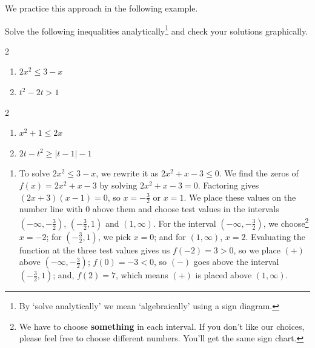 \documentclass{ximera}
\begin{document}

\medskip

We practice this approach in the following example.

\begin{example}  Solve the following inequalities analytically\footnote{By `solve analytically' we mean `algebraically' using a sign diagram.} and check your solutions graphically.

\begin{multicols}{2}
\begin{enumerate}

\item  $2x^2 \leq 3-x$

\item  $t^2 - 2t > 1$

\setcounter{HW}{\value{enumi}}
\end{enumerate}
\end{multicols}

\begin{multicols}{2}
\begin{enumerate}
\setcounter{enumi}{\value{HW}}

\item  $x^2+1 \leq 2x$

\item  $2t-t^2 \geq |t-1|-1$

\end{enumerate}
\end{multicols}

\begin{explanation}

\begin{enumerate}

\item  To solve $2x^2 \leq 3-x$, we rewrite it as $2x^2+x-3 \leq 0$.  We find the zeros of $f(x) = 2x^2 + x - 3$ by solving $2x^2 + x - 3 = 0$.  Factoring gives $(2x+3)(x-1)=0$, so $x = -\frac{3}{2}$ or $x = 1$.  We place these values on the number line with $0$ above them and choose test values in the intervals $\left(-\infty, -\frac{3}{2}\right)$, $\left(-\frac{3}{2},1\right)$ and $(1,\infty)$.  For the interval  $\left(-\infty, -\frac{3}{2}\right)$, we choose\footnote{We have to choose \textbf{something} in each interval.  If you don't like our choices, please feel free to choose different numbers.  You'll get the same sign chart.} $x=-2$; for $\left(-\frac{3}{2},1\right)$, we pick $x=0$; and for $(1,\infty)$, $x=2$. Evaluating the function at the three test values gives us $f(-2) = 3 > 0$, so we place $(+)$ above $\left(-\infty, -\frac{3}{2}\right)$;  $f(0)=-3 < 0$, so $(-)$ goes above the interval $\left(-\frac{3}{2},1\right)$;  and, $f(2) = 7$, which means $(+)$ is placed above $(1,\infty)$.


\end{enumerate}
\end{explanation}
\end{example}
\end{document}
